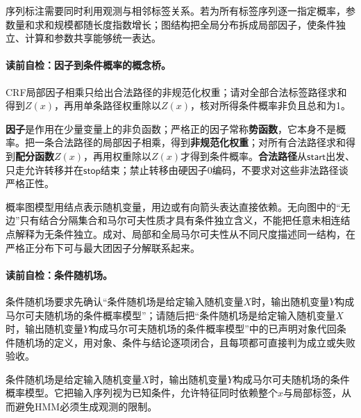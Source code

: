 \label{struct:V3-C06-CH06}
序列标注需要同时利用观测与相邻标签关系。若为所有标签序列逐一指定概率，参数量和求和规模都随长度指数增长；图结构把全局分布拆成局部因子，使条件独立、计算和参数共享能够统一表达。

\paragraph{读前自检：因子到条件概率的概念桥。}CRF局部因子相乘只给出合法路径的非规范化权重；请对全部合法标签路径求和得到$Z(x)$，再用单条路径权重除以$Z(x)$，核对所得条件概率非负且总和为1。\par

\begin{keypointbox}[title=因子到条件概率的概念桥]
\textbf{因子}是作用在少量变量上的非负函数；严格正的因子常称\textbf{势函数}，它本身不是概率。把一条合法路径的局部因子相乘，得到\textbf{非规范化权重}；对所有合法路径求和得到\textbf{配分函数}$Z(x)$，再用权重除以$Z(x)$才得到条件概率。\textbf{合法路径}从$\mathsf{start}$出发、只走允许转移并在$\mathsf{stop}$结束；禁止转移由硬因子$0$编码，不要求对这些非法路径谈严格正性。
\end{keypointbox}

概率图模型用结点表示随机变量，用边或有向箭头表达直接依赖。无向图中的“无边”只有结合分隔集合和马尔可夫性质才具有条件独立含义，不能把任意未相连结点解释为无条件独立。成对、局部和全局马尔可夫性从不同尺度描述同一结构，在严格正分布下可与最大团因子分解联系起来。

\paragraph{读前自检：条件随机场。}条件随机场要求先确认“条件随机场是给定输入随机变量$X$时，输出随机变量$Y$构成马尔可夫随机场的条件概率模型”；请随后把“条件随机场是给定输入随机变量$X$时，输出随机变量$Y$构成马尔可夫随机场的条件概率模型”中的已声明对象代回条件随机场的定义，用对象、条件与结论逐项闭合，且每项都可直接判为成立或失败验收。\par

条件随机场是给定输入随机变量$X$时，输出随机变量$Y$构成马尔可夫随机场的条件概率模型。它把输入序列视为已知条件，允许特征同时依赖整个$x$与局部标签，从而避免HMM必须生成观测的限制。


